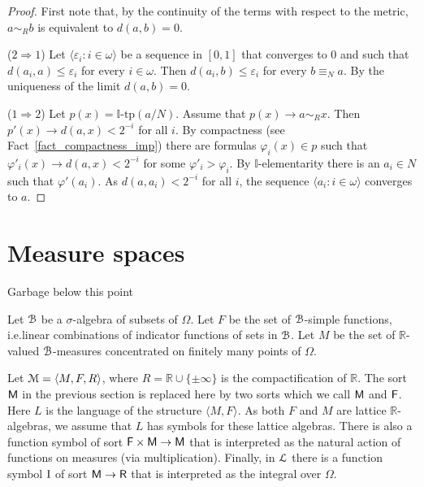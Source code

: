 \documentclass[11pt,oneside]{amsart}
\begin{document}
\begin{proof}
  First note that, by the continuity of the terms with respect to the metric, $a\sim_{\!R} b$ is equivalent to $d(a,b)=0$.

  ($2\Rightarrow1$) Let  $\langle \varepsilon_i: i\in\omega\rangle$ be a sequence in $[0,1]$ that converges to $0$ and such that $d(a_i,a)\le\varepsilon_i$ for every $i\in\omega$.
  Then $d(a_i,b)\le\varepsilon_i$ for every $b\equiv_Na$.
  By the uniqueness of the limit $d(a,b)=0$.

  ($1\Rightarrow2$) Let $p(x)=\mathds{I}\mbox{-tp}(a/N)$.
  Assume that $p(x)\rightarrow a\sim_{\!R} x$.
  Then $p'(x)\rightarrow d(a,x)<2^{-i}$ for all $i$.
  By compactness (see Fact~\ref{fact_compactness_imp}) there are formulas $\varphi_i(x)\in p$ such that $\varphi'_i(x)\rightarrow d(a,x)<2^{-i}$ for some $\varphi'_i>\varphi_i$.
  By $\mathds{I}$-elementarity there is an $a_i\in N$ such that $\varphi'(a_i)$.
  As $d(a,a_i)<2^{-i}$ for all $i$, the sequence $\langle a_i: i\in\omega\rangle$ converges to $a$.
\end{proof}


\section{Measure spaces}

\noindent\llap{\textcolor{red}{\Large\dangersign}\kern1ex}\ignorespaces
Garbage below this point

Let ${\EuScript B}$ be a $\sigma$-algebra of subsets of $\Omega$.
Let $F$ be the set of ${\EuScript B}$-simple functions, i.e.\@ linear combinations of indicator functions of sets in ${\EuScript B}$.
Let $M$ be the set of $\mathds{R}$-valued ${\EuScript B}$-measures concentrated on finitely many points of $\Omega$.

Let ${\EuScript M}=\langle M,F,R\rangle$, where $R=\mathds{R}\cup\{\pm\infty\}$ is the compactification of $\mathds{R}$.
The sort ${\sf M}$ in the previous section is replaced here by two sorts which we call ${\sf M}$ and ${\sf F}$.
Here $L$ is the language of the structure $\langle M,F\rangle$.
As both $F$ and $M$ are lattice $\mathds{R}$-algebras, we assume that $L$ has symbols for these lattice algebras.
There is also a function symbol of sort ${\sf F}\times{\sf M}\to{\sf M}$ that is interpreted as the natural action of functions on measures (via multiplication).
Finally, in ${\EuScript L}$ there is a function symbol ${\rm I}$ of sort ${\sf M}\to{\sf R}$ that is interpreted as the integral over $\Omega$.
\end{document}
